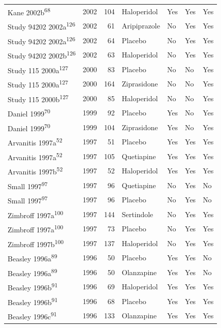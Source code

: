 \documentclass[
  9pt,
  english,
  ,jou,floatsintext]{apa6}
\begin{document}
\begin{longtable}[]{@{}lrrllll@{}}
Kane 2002b\textsuperscript{68} & 2002 & 104 & Haloperidol & Yes & Yes & Yes \\
Study 94202 2002a\textsuperscript{126} & 2002 & 61 & Aripiprazole & No & Yes & Yes \\
Study 94202 2002a\textsuperscript{126} & 2002 & 64 & Placebo & No & Yes & Yes \\
Study 94202 2002b\textsuperscript{126} & 2002 & 63 & Haloperidol & No & Yes & Yes \\
Study 115 2000a\textsuperscript{127} & 2000 & 83 & Placebo & No & No & Yes \\
Study 115 2000a\textsuperscript{127} & 2000 & 164 & Ziprasidone & No & No & Yes \\
Study 115 2000b\textsuperscript{127} & 2000 & 85 & Haloperidol & No & No & Yes \\
Daniel 1999\textsuperscript{70} & 1999 & 92 & Placebo & Yes & No & Yes \\
Daniel 1999\textsuperscript{70} & 1999 & 104 & Ziprasidone & Yes & No & Yes \\
Arvanitis 1997a\textsuperscript{52} & 1997 & 51 & Placebo & Yes & Yes & Yes \\
Arvanitis 1997a\textsuperscript{52} & 1997 & 105 & Quetiapine & Yes & Yes & Yes \\
Arvanitis 1997b\textsuperscript{52} & 1997 & 52 & Haloperidol & Yes & Yes & Yes \\
Small 1997\textsuperscript{97} & 1997 & 96 & Quetiapine & No & Yes & No \\
Small 1997\textsuperscript{97} & 1997 & 96 & Placebo & No & Yes & No \\
Zimbroff 1997a\textsuperscript{100} & 1997 & 144 & Sertindole & No & Yes & Yes \\
Zimbroff 1997a\textsuperscript{100} & 1997 & 73 & Placebo & No & Yes & Yes \\
Zimbroff 1997b\textsuperscript{100} & 1997 & 137 & Haloperidol & No & Yes & Yes \\
Beasley 1996a\textsuperscript{89} & 1996 & 50 & Placebo & Yes & Yes & No \\
Beasley 1996a\textsuperscript{89} & 1996 & 50 & Olanzapine & Yes & Yes & No \\
Beasley 1996b\textsuperscript{91} & 1996 & 69 & Haloperidol & Yes & Yes & Yes \\
Beasley 1996b\textsuperscript{91} & 1996 & 68 & Placebo & Yes & Yes & Yes \\
Beasley 1996c\textsuperscript{91} & 1996 & 133 & Olanzapine & Yes & Yes & Yes \\

\end{longtable}
\end{document}
